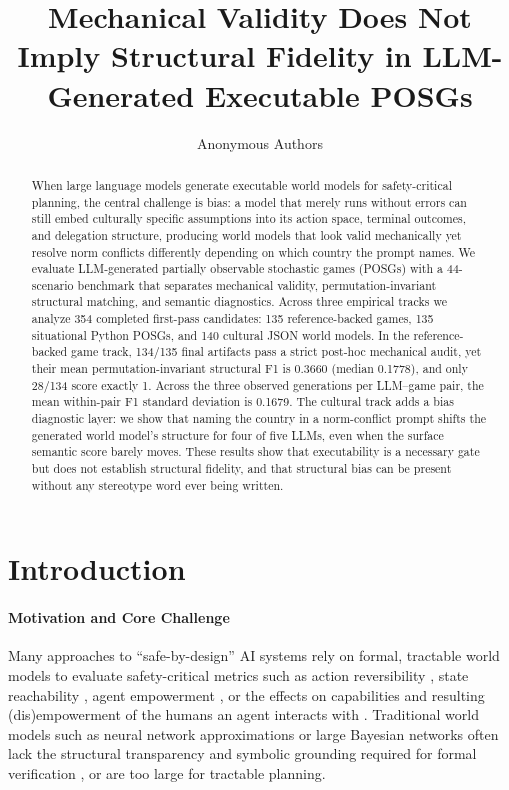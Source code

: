 \documentclass{article}
\title{Mechanical Validity Does Not Imply Structural Fidelity in LLM-Generated Executable POSGs}
\author{Anonymous Authors}
\begin{document}
\maketitle


\begin{abstract}
When large language models generate executable world models for safety-critical planning, the central challenge is bias: a model that merely runs without errors can still embed culturally specific assumptions into its action space, terminal outcomes, and delegation structure, producing world models that look valid mechanically yet resolve norm conflicts differently depending on which country the prompt names. We evaluate LLM-generated partially observable stochastic games (POSGs) with a 44-scenario benchmark that separates mechanical validity, permutation-invariant structural matching, and semantic diagnostics. Across three empirical tracks we analyze 354 completed first-pass candidates: 135 reference-backed games, 135 situational Python POSGs, and 140 cultural JSON world models. In the reference-backed game track, 134/135 final artifacts pass a strict post-hoc mechanical audit, yet their mean permutation-invariant structural F1 is 0.3660 (median 0.1778), and only 28/134 score exactly 1. Across the three observed generations per LLM--game pair, the mean within-pair F1 standard deviation is 0.1679. The cultural track adds a bias diagnostic layer: we show that naming the country in a norm-conflict prompt shifts the generated world model's structure for four of five LLMs, even when the surface semantic score barely moves. These results show that executability is a necessary gate but does not establish structural fidelity, and that structural bias can be present without any stereotype word ever being written.
\end{abstract}

\section{Introduction}
\label{sec:intro}
\paragraph{Motivation and Core Challenge}
Many approaches to ``safe-by-design'' AI systems \citep{dalrymple2024guaranteedsafeaiframework} rely on formal, tractable world models to evaluate safety-critical metrics such as action reversibility \citep{eysenbach2018leave}, state reachability \citep{krakovna2020avoiding}, agent empowerment \citep{klyubin2005empowerment}, or the effects on capabilities and resulting (dis)empowerment of the humans an agent interacts with \citep{salge2017empowerment,heitzigfair}. 
Traditional world models such as neural network approximations or large Bayesian networks \citep{amodei2016concrete,ha2018world} often lack the structural transparency and symbolic grounding required for formal verification \citep{konidaris2018from}, or are too large for tractable planning.
\end{document}
